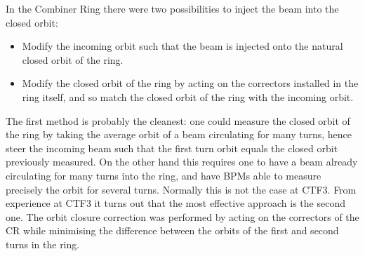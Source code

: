 In the Combiner Ring there were two possibilities to inject the beam into the closed orbit:
\begin{itemize}
\item Modify the incoming orbit such that the beam is injected onto 
      the natural closed orbit of the ring.
\item Modify the closed orbit of the ring by acting on the correctors installed in 
      the ring itself, and so match the closed orbit of the ring with the incoming orbit.
\end{itemize}
%
The first method is probably the cleanest: 
one could measure the closed orbit of the ring by taking the average orbit of 
a beam circulating for many turns, hence steer the incoming beam such that 
the first turn orbit equals the closed orbit previously measured.
On the other hand this requires one to have a beam already circulating for many turns 
into the ring, and have BPMs able to measure precisely the orbit for several turns.
Normally this is not the case at CTF3. From experience at CTF3 it turns out that the most effective
approach is the second one. The orbit closure correction was performed by acting on the correctors of
the CR while minimising the difference between the orbits of the first and second turns in the ring.

